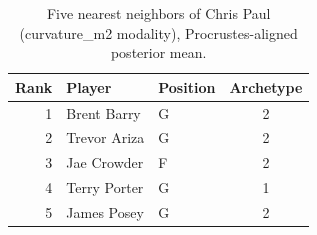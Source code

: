 \begin{table}[htbp]
  \centering\small
  \begin{tabular}{rllc}
    \toprule
    Rank & Player & Position & Archetype \\
    \midrule
    1 & Brent Barry & G & 2 \\
    2 & Trevor Ariza & G & 2 \\
    3 & Jae Crowder & F & 2 \\
    4 & Terry Porter & G & 1 \\
    5 & James Posey & G & 2 \\
    \bottomrule
  \end{tabular}
  \caption{Five nearest neighbors of Chris Paul (curvature_m2 modality), Procrustes-aligned posterior mean.}
  \label{tab:Chris_Paul_neighbors_curvature_m2}
\end{table}

